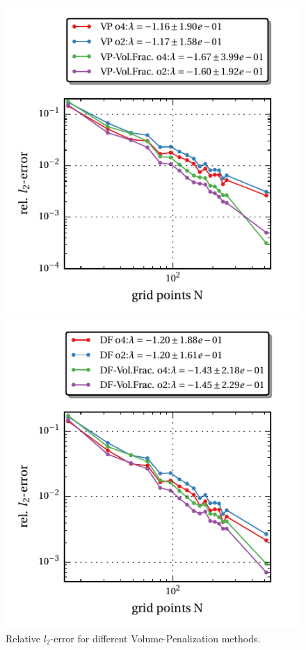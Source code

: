 \clearpage
\begin{figure}[!bp]
  \begin{minipage}[c]{0.5\textwidth}
      \includegraphics{gfx/immersed_boundary/hpflow/theo/vp.pdf}
      \caption{Relative $l_2$-error for different Volume-Penalization methods.}
  \end{minipage}
  \begin{minipage}[c]{0.5\textwidth}
      \includegraphics{gfx/immersed_boundary/hpflow/theo/df.pdf}

\end{minipage}
\end{figure}
